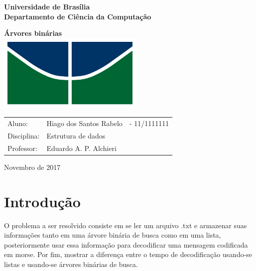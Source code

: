 \documentclass[12 pt, a4paper]{article}
\begin{document}
	\begin{titlepage}
		\begin{center}
			{\large \textbf{Universidade de Bras\'ilia}}\\
			{\large \textbf{Departamento de Ci\^encia da Computa\c{c}\~ao}}\vspace{1.0cm}

			{\Huge \textbf{\'Arvores bin\'arias}}\\[7.0cm]
			\includegraphics[height=10em]{images/CIC_header}\\[6.0cm]

		\end{center}

		\begin{table}[h]
		\begin{tabular}{l lr}
		Aluno:    	& Hiago dos Santos Rabelo&- 11/1111111\\
		Disciplina:	& Estrutura de dados\\
		Professor:	& Eduardo A. P. Alchieri\vspace{1.5cm}\\

		\end{tabular}
		\end{table}


		\center \date[Novembro de 2017
			
	\end{titlepage}

\tableofcontents

\newpage
\section {Introdu\c{c}\~ao}

O problema a ser resolvido consiste em se ler um arquivo .txt e armazenar suas informa\c{c}\~oes tanto em uma \'arvore bin\'aria de busca como em uma lista, posteriormente usar essa informa\c{c}\~ao para decodificar uma mensagem codificada em morse. 
\newline
Por fim, mostrar a diferen\c{c}a entre o tempo de decodifica\c{c}\~ao usando-se listas e usando-se \'arvores bin\'arias de busca.
\end{document}
